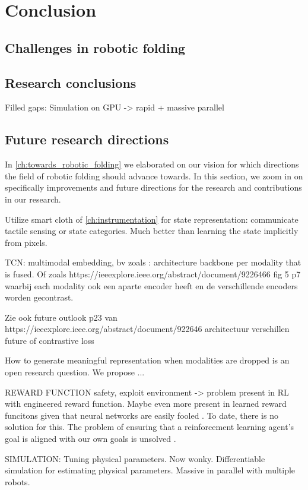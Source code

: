 \documentclass[\home/main.tex]{subfiles}
\begin{document}
\chapter{Conclusion}\label{ch:conclusion}

\section{Challenges in robotic folding}

\section{Research conclusions}
Filled gaps:
    Simulation on GPU -> rapid + massive parallel 


\section{Future research directions} \label{sec:conc_future_work}
In \cref{ch:towards_robotic_folding} we elaborated on our vision for which directions the field of robotic folding should advance towards. In this section, we zoom in on specifically improvements and future directions for the research and contributions in our research. 

Utilize smart cloth of \cref{ch:instrumentation} for state representation: communicate tactile sensing or state categories. Much better than learning the state implicitly from pixels. 


TCN:
    multimodal embedding, bv zoals \autocite{making sense of vision and touch}: architecture backbone per modality that is fused. Of zoals https://ieeexplore.ieee.org/abstract/document/9226466 fig 5 p7 waarbij each modality ook een aparte encoder heeft en de verschillende encoders worden gecontrast. 

    Zie ook future outlook p23 van https://ieeexplore.ieee.org/abstract/document/922646
        architectuur verschillen
        future of contrastive loss

    How to generate meaningful representation when modalities are dropped is an open research question. We propose ... 


REWARD FUNCTION 
    safety, exploit environment -> problem present in RL with engineered reward function. Maybe even more present in learned reward funcitons given that neural networks are easily fooled \autocite{nn are easily fooled, adversarial examples}. To date, there is no solution for this. The problem of ensuring that a reinforcement learning agent’s goal is aligned with our own goals is unsolved \autocite{Sutton2018}. 

SIMULATION:
    Tuning physical parameters. Now wonky. Differentiable simulation for estimating physical parameters.
    Massive in parallel with multiple robots. 
\end{document}
